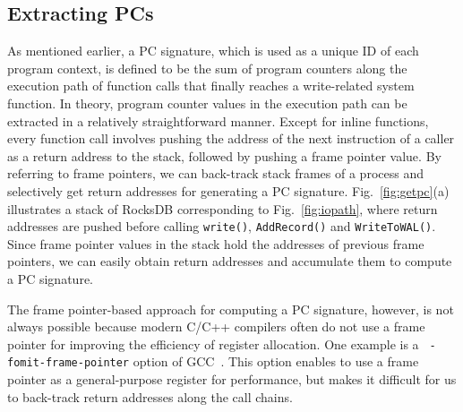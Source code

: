 \subsection{Extracting PCs}
\vspace{-5pt}
As mentioned earlier, a PC signature, which is used as a unique ID of each
program context, is defined to be the sum of program counters along the
execution path of function calls that finally reaches a write-related system
function.  In theory, program counter values in the execution path can be
extracted in a relatively straightforward manner.  Except for inline functions,
every function call involves pushing the address of the next instruction of a
caller as a return address to the stack, followed by pushing a frame pointer
value.  By referring to frame pointers, we can back-track stack frames of a
process and selectively get return addresses for generating a PC signature.
Fig.~\ref{fig:getpc}(a) illustrates a stack of RocksDB corresponding to
Fig.~\ref{fig:iopath}, where return addresses are pushed before calling
\texttt{write()}, \texttt{AddRecord()} and \texttt{WriteToWAL()}.  Since frame
pointer values in the stack hold the addresses of previous frame pointers, we
can easily obtain return addresses and accumulate them to compute a PC signature.  


The frame pointer-based approach for computing a PC signature, however, is not
always possible because modern C/C++ compilers often do not use a frame pointer
for improving the efficiency of register allocation.  One example is a {\tt
-fomit-frame-pointer} option of GCC~\cite{GCC}.  This option enables to use a frame
pointer as a general-purpose register for performance, but makes it difficult for us
to back-track return addresses along the call chains.  

